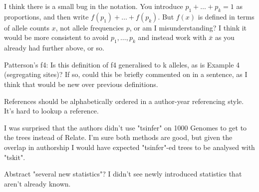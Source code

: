 \reply{
}

\begin{point}{\revref}
    I think there is a small bug in the notation. You introduce $p_1+\ldots+p_k=1$ as proportions, and then write $f(p_1)+\ldots+f(p_k)$. But $f(x)$ is defined in terms of allele counts $x$, not allele frequencies $p$, or am I misunderstanding? I think it would be more consistent to avoid $p_1,\ldots,p_k$ and instead work with $\bar{x}$ as you already had further above, or so.
\end{point}


\begin{point}{\revref}
    Patterson's f4: Is this definition of f4 generalised to k alleles, as is Example 4 (segregating sites)? If so, could this be briefly commented on in a sentence, as I think that would be new over previous definitions.
\end{point}


\begin{point}{References}
    should be alphabetically ordered in a author-year referencing style. It's hard to lookup a reference.
\end{point}


\begin{point}{\revref}
I was surprised that the authors didn't use "tsinfer" on 1000 Genomes to get to the trees instead of Relate. I'm sure both methods are good, but given the overlap in authorship I would have expected "tsinfer"-ed trees to be analysed with "tskit".
\end{point}


\begin{point}{Abstract \revref}
    "several new statistics"? I didn't see newly introduced statistics that aren't already known.
\end{point}


